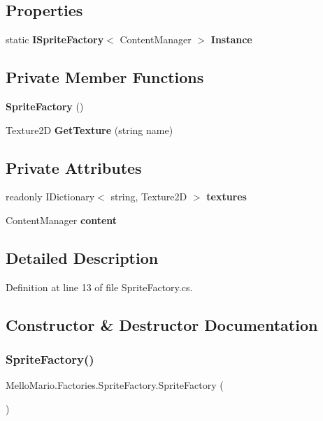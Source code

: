 \subsection*{Properties}
\begin{DoxyCompactItemize}
\item 
static \textbf{ I\+Sprite\+Factory}$<$ Content\+Manager $>$ \textbf{ Instance}\hspace{0.3cm}{\ttfamily  [get]}
\end{DoxyCompactItemize}
\subsection*{Private Member Functions}
\begin{DoxyCompactItemize}
\item 
\textbf{ Sprite\+Factory} ()
\item 
Texture2D \textbf{ Get\+Texture} (string name)
\end{DoxyCompactItemize}
\subsection*{Private Attributes}
\begin{DoxyCompactItemize}
\item 
readonly I\+Dictionary$<$ string, Texture2D $>$ \textbf{ textures}
\item 
Content\+Manager \textbf{ content}
\end{DoxyCompactItemize}


\subsection{Detailed Description}


Definition at line 13 of file Sprite\+Factory.\+cs.



\subsection{Constructor \& Destructor Documentation}
\mbox{\label{classMelloMario_1_1Factories_1_1SpriteFactory_a0a54e2f3fe99d2426ee7903c9cd3d84d}} 
\subsubsection{Sprite\+Factory()}
{\footnotesize\ttfamily Mello\+Mario.\+Factories.\+Sprite\+Factory.\+Sprite\+Factory (\begin{DoxyParamCaption}{ }\end{DoxyParamCaption})\hspace{0.3cm}{\ttfamily [private]}}



